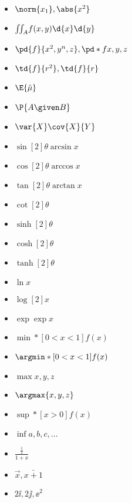 \documentclass{minimal}
\begin{document}
	\begin{itemize}
		\item \(\norm{x_1}, \abs{x^2}\)
		\item \(\iint_A\! f(x,y) \d{x}\d{y}\)
		\item \(\pd{f}{x^2,y^n,z}, \pd*{f}{x,y,z}\)
		\item \(\td{f}{r^2}, \td{f}{r}\)
		\item \(\E{\hat{\mu}}\)
		\item \(\P{A\given B}\)
		\item \(\var{X}\cov{X}{Y}\)
		\item \(\sin[2]{\theta}\arcsin{x}\)
		\item \(\cos[2]{\theta}\arccos{x}\)
		\item \(\tan[2]{\theta}\arctan{x}\)
		\item \(\cot[2]{\theta}\)
		\item \(\sinh[2]{\theta}\)
		\item \(\cosh[2]{\theta}\)
		\item \(\tanh[2]{\theta}\)
		\item \(\ln{x}\)
		\item \(\log[2]{x}\)
		\item \(\exp{\exp{x}}\)
		\item \(\min*[0<x<1]{f(x)}\)
		\item \(\argmin*[0<x<1]{f(x)}\)
		\item \(\max{x,y,z}\)
		\item \(\argmax{x,y,z}\)
		\item \(\sup*[x>0]{f(x)}\)
		\item \(\inf{a,b,c,\dotsc}\)
		\item \(\frac{\frac{1}{2}}{1+x}\)
		\item \(\vec{x}, \bar{x+1}\)
		\item \(2\ii, 2\jj, \ee^2\)
	\end{itemize}
\end{document}
